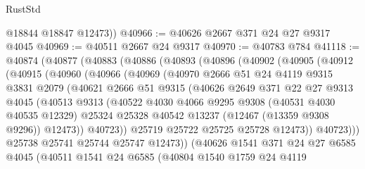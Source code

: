 \begin{lexlean}{RustStd}
\begin{coremodule}
        @18844
        @18847
        @12473))
@40966 := @40626 @2667 @371 @24 @27 @9317 @4045
@40969 := @40511 @2667 @24 @9317
@40970 := @40783 @784
@41118 := @40874
    (@40877
      (@40883
        (@40886
          (@40893
            (@40896
              (@40902
                (@40905
                  (@40912
                    (@40915
                      (@40960
                        (@40966
                          (@40969
                            (@40970
                              @2666
                              @51
                              @24
                              @4119
                              @9315
                              @3831
                              @2079
                              (@40621
                                @2666
                                @51
                                @9315
                                (@40626
                                  @2649
                                  @371
                                  @22
                                  @27
                                  @9313
                                  @4045
                                  (@40513
                                    @9313
                                    (@40522
                                      @4030
                                      @4066
                                      @9295
                                      @9308
                                      (@40531 @4030 @40535 @12329)
                                      @25324
                                      @25328
                                      @40542
                                      @13237
                                      (@12467 (@13359 @9308 @9296))
                                      @12473))
                                  @40723))
                              @25719
                              @25722
                              @25725
                              @25728
                              @12473))
                          @40723)))
                    @25738
                    @25741
                    @25744
                    @25747
                    @12473))
                (@40626
                  @1541
                  @371
                  @24
                  @27
                  @6585
                  @4045
                  (@40511
                    @1541
                    @24
                    @6585
                    (@40804
                      @1540
                      @1759
                      @24
                      @4119

\end{coremodule}
\end{lexlean}
